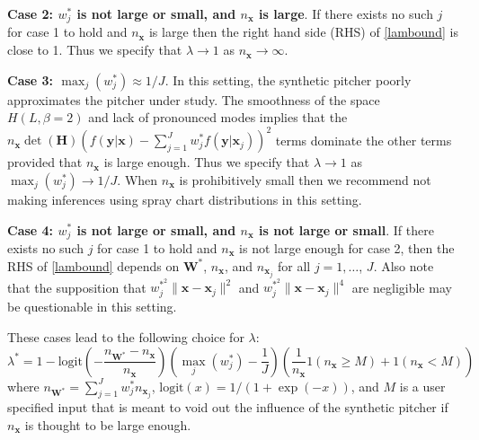 \documentclass[11pt]{article}
\newcommand{\Hbf}{\textbf{H}}
\newcommand{\W}{\textbf{W}}
\newcommand{\y}{\textbf{y}}
\newcommand{\x}{\textbf{x}}
\newcommand{\Wstar}{\W^{\textstyle{*}}}
\newcommand{\wstar}{w^{\textstyle{*}}}
\newcommand{\wstarsq}{w^{\textstyle{*}^2}}
\newcommand{\lamstar}{\lambda^{\textstyle{*}}}
\begin{document}
\vspace{0.25cm}
\textbf{Case 2: $\wstar_j$ is not large or small, and $n_{\x}$ is large}. If there exists no such $j$ for case 1 to hold and $n_{\x}$ is large then the right hand side (RHS) of \eqref{lambound} is close to 1. Thus we specify that $\lambda \to 1$ as $n_{\x} \to \infty$. 

\vspace{0.25cm}
\textbf{Case 3: $\max_j(\wstar_j) \approx 1/J$}. In this setting, the synthetic pitcher poorly approximates the pitcher under study. The smoothness of the space $H(L,\beta=2)$ and lack of pronounced modes implies that the $n_\x\det(\Hbf)\left(f(\y|\x) - \sum_{j=1}^J\wstar_jf(\y|\x_j)\right)^2$ terms dominate the other terms provided that $n_{\x}$ is large enough. Thus we specify that $\lambda \to 1$ as $\max_j(\wstar_j) \to 1/J$. When $n_{\x}$ is prohibitively small then we recommend not making inferences using spray chart distributions in this setting.

\vspace{0.25cm}
\textbf{Case 4: $\wstar_j$ is not large or small, and $n_{\x}$ is not large or small}. If there exists no such $j$ for case 1 to hold and $n_{\x}$ is not large enough for case 2, then the RHS of \eqref{lambound} depends on $\Wstar$, $n_{\x}$, and $n_{\x_j}$ for all $j = 1,\ldots$, $J$. Also note that the supposition that $\wstarsq_j\|\x-\x_j\|^2$ and $\wstarsq_j\|\x-\x_j\|^4$ are negligible may be questionable in this setting.


\vspace{0.25cm}
These cases lead to the following choice for $\lambda$:
$$
  \lamstar = 1 - \text{logit}\left(-\frac{n_{\Wstar} - n_\x}{n_\x}\right)
    \left(\max_j(\wstar_j) - \frac{1}{J}\right)
    \left(\frac{1}{n_\x}1(n_\x \geq M) + 1(n_\x < M) \right)
$$
where $n_{\Wstar} = \sum_{j=1}^J \wstar_j n_{\x_j}$, $\text{logit}(x) = 1/(1 + \exp(-x))$, and $M$ is a user specified input that is meant to void out the influence of the synthetic pitcher if $n_\x$ is thought to be large enough.









\end{document}

